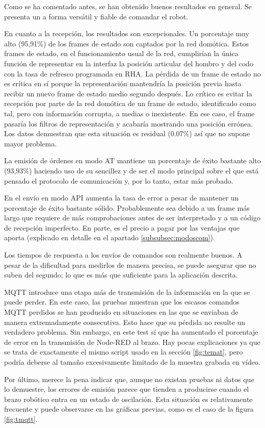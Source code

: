 Como se ha comentado antes, se han obtenido buenos resultados en general. Se presenta un a forma versátil y fiable de comandar el robot.

En cuanto a la recepción, los resultados son excepcionales. Un porcentaje muy alto (95,91\%) de los frames de estado son captados por la red domótica. Estos frames de estado, en el funcionamiento usual de la red, cumplirían la única función de representar en la interfaz la posición articular del hombro y del codo con la tasa de refresco programada en RHA. La pérdida de un frame de estado no es crítica en sí porque la representación mantendría la posición previa hasta recibir un nuevo frame de estado medio segundo después. Lo crítico es evitar la recepción por parte de la red domótica de un frame de estado, identificado como tal, pero con información corrupta, a medias o inexistente. En ese caso, el frame pasaría los filtros de representación y acabaría mostrando una posición errónea. Los datos demuestran que esta situación es residual (0.07\%) así que no supone mayor problema.

La emisión de órdenes en modo AT mantiene un porcentaje de éxito bastante alto (93,93\%) haciendo uso de su sencillez y de ser el modo principal sobre el que está pensado el protocolo de comunicación y, por lo tanto, estar más probado.

En el envío en modo API aumenta la tasa de error a pesar de mantener un porcentaje de éxito bastante sólido. Probablemente sea debido a un frame más largo que requiere de más comprobaciones antes de ser interpretado y a un código de recepción imperfecto. En parte, es el precio a pagar por las ventajas que aporta (explicado en detalle en el apartado \ref{subsubsec:modoscom}).

Los tiempos de respuesta a los envíos de comandos son realmente buenos. A pesar de la dificultad para medirlos de manera precisa, se puede asegurar que no suben del segundo; lo que es más que suficiente para la aplicación descrita.

MQTT introduce una etapa más de transmisión de la información en la que se puede perder. En este caso, las pruebas muestran que los escasos comandos MQTT perdidos se han producido en situaciones en las que se enviaban de manera extremadamente consecutiva. Esto hace que su pérdida no resulte un verdadero problema. Sin embargo, en este test sí que ha aumentado el porcentaje de error en la transmisión de Node-RED al brazo. Hay pocas explicaciones ya que se trata de exactamente el mismo script usado en la sección \ref{fig:temat}, pero podría deberse al tamaño excesivamente limitado de la muestra grabada en vídeo.

Por último, merece la pena indicar que, aunque no existan pruebas ni datos que lo demuestre, los errores de emisión parece que tienden a producirse cuando el brazo robótico entra en un estado de oscilación. Esta situación es relativamente frecuente y puede observarse en las gráficas previas, como es el caso de la figura \ref{fig:tmqtt}.